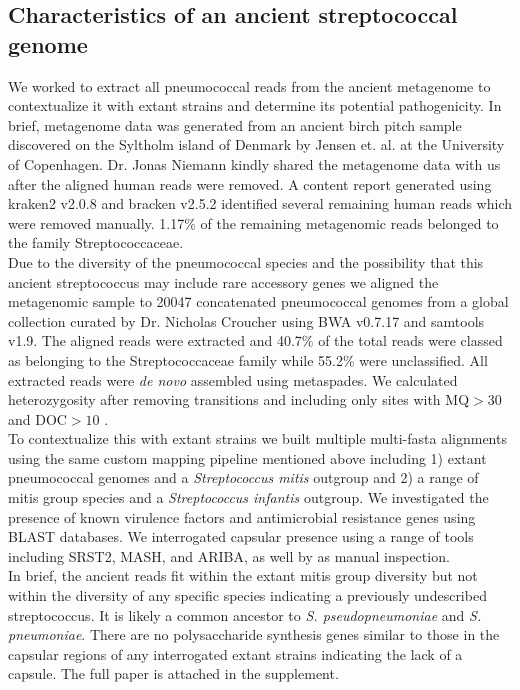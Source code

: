 \documentclass{article}
\begin{document}
\subsection{Characteristics of an ancient streptococcal genome }
We worked to extract all pneumococcal reads from the ancient metagenome to contextualize it with extant strains and determine its potential pathogenicity. In brief, metagenome data was generated from an ancient birch pitch sample discovered on the Syltholm island of Denmark by Jensen et. al. at the University of Copenhagen\cite{jensen5700YearoldHuman2019}. Dr. Jonas Niemann kindly shared the metagenome data with us after the aligned human reads were removed. A content report generated using kraken2 v2.0.8 and bracken v2.5.2 \cite{KrakenUltrafastMetagenomic,luBrackenEstimatingSpecies2017} identified several remaining human reads which were removed manually. 1.17\% of the remaining metagenomic reads belonged to the family Streptococcaceae. \\Due to the diversity of the pneumococcal species and the  possibility that this ancient streptococcus may include rare accessory genes we aligned the metagenomic sample to 20047 concatenated pneumococcal genomes from a global collection curated by Dr. Nicholas Croucher using BWA v0.7.17 and samtools v1.9\cite{liStatisticalFrameworkSNP2011,liFastAccurateShort2009}. The aligned reads were extracted and 40.7\% of the total reads were classed as belonging to the Streptococcaceae family while 55.2\% were unclassified. All extracted reads were \textit{de novo} assembled using metaspades\cite{nurkMetaSPAdesNewVersatile2017}. We calculated heterozygosity after removing transitions and including only sites with MQ$>30$ and DOC$>10$ \cite{liStatisticalFrameworkSNP2011}. 
\\To contextualize this with extant strains we built multiple multi-fasta alignments using the same custom mapping pipeline mentioned above including 1) extant pneumococcal genomes and a \textit{Streptococcus mitis} outgroup and 2) a range of mitis group species and a \textit{Streptococcus infantis} outgroup. We investigated the presence of known virulence factors and antimicrobial resistance genes using BLAST databases. We interrogated capsular presence using a range of tools including SRST2, MASH, and ARIBA, as well by as manual inspection. \\In brief, the ancient reads fit within the extant mitis group diversity but not within the diversity of any specific species indicating a previously undescribed streptococcus. It is likely a common ancestor to \textit{S. pseudopneumoniae} and \textit{S. pneumoniae}. There are no polysaccharide synthesis genes similar to those in the capsular regions of any interrogated extant strains indicating the lack of a capsule. The full paper is attached in the supplement.
\end{document}

